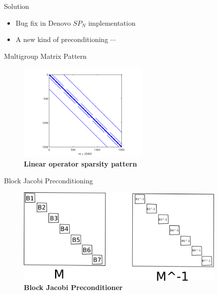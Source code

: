 \documentclass{beamer}
\begin{document}
\begin{frame}{Solution}

  \begin{itemize}
  \item Bug fix in Denovo $SP_N$ implementation
  \item A new kind of preconditioning $\cdots$
  \end{itemize}

\end{frame}

\begin{frame}{Multigroup Matrix Pattern}

  \begin{figure}[h!]
    \centering
    \includegraphics[width=2.5in,clip]{opSpySPn7P3G3.png}
    \caption{\textbf{Linear operator sparsity pattern}}
  \end{figure}

\end{frame}

\begin{frame}{Block Jacobi Preconditioning}

  \begin{figure}[h!]
    \centering
    \includegraphics[width=4in,clip]{block_preconditioning.png}
    \caption{\textbf{Block Jacobi Preconditioner}}
  \end{figure}

\end{frame}
\end{document}
